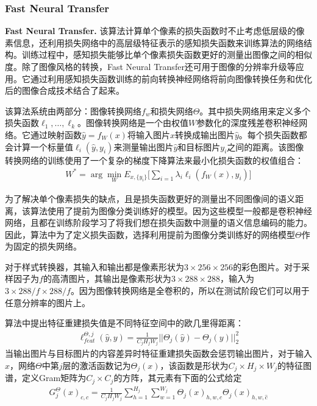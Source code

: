 
\subsubsection{Fast Neural Transfer}

\textbf{Fast Neural Transfer.}\cite{FNT} 该算法计算单个像素的损失函数时不止考虑低层级的像素信息，还利用损失网络中的高层级特征表示的感知损失函数来训练算法的网络结构。训练过程中，感知损失能够比单个像素损失函数更好的测量出图像之间的相似度。除了图像风格的转换，Fast Neural Transfer还可用于图像的分辨率升级等应用。它通过利用感知损失函数训练的前向转换神经网络将前向图像转换任务和优化后的图像合成技术结合了起来。

该算法系统由两部分：图像转换网络$f_w$和损失网络$\Theta$。其中损失网络用来定义多个损失函数$\ell_1,\dots,\ell_k$。图像转换网络是一个由权值$W$参数化的深度残差卷积神经网络。它通过映射函数$\hat{y}=f_W(x)$将输入图片$x$转换成输出图片$\hat{y}$。每个损失函数都会计算一个标量值$\ell_i(\hat{y},y_i)$来测量输出图片$\hat{y}$和目标图片$y_i$之间的距离。该图像转换网络的训练使用了一个复杂的梯度下降算法来最小化损失函数的权值组合：
\begin{align}
    W^*=\arg \min_W E_{x,\{y_i\}}\Big[\sum_{i=1}\lambda_i\ell_i(f_W(x),y_i)\Big]
\end{align}

为了解决单个像素损失的缺点，且是损失函数更好的测量出不同图像间的语义距离，该算法使用了提前为图像分类训练好的模型。因为这些模型一般都是卷积神经网络，且都在训练阶段学习了将我们想在损失函数中测量的语义信息编码的能力。因此，算法中为了定义损失函数，选择利用提前为图像分类训练好的网络模型$\Theta$作为固定的损失网络。

对于样式转换器，其输入和输出都是像素形状为$3\times 256 \times 256$的彩色图片。对于采样因子为$f$的高清图片，其输出是像素形状为$3\times288\times288$，输入为$3\times288/f\times288/f$。因为图像转换网络是全卷积的，所以在测试阶段它们可以用于任意分辨率的图片上。

算法中提出特征重建损失值是不同特征空间中的欧几里得距离：
\begin{align}
    \ell_{feat}^{\Theta,j}(\hat{y},y)=\frac{1}{C_jH_jW_j}||\Theta_j(\hat{y})-\Theta_j(y)||_2^2
\end{align}
当输出图片与目标图片的内容差异时特征重建损失函数会惩罚输出图片，对于输入$x$，网络$\Theta$中第$j$层的激活函数记为$\Theta_j(x)$，该函数是形状为$C_j\times H_j\times W_j$的特征图谱，定义Gram矩阵为$C_j\times C_j$的方阵，其元素有下面的公式给定
\begin{align}
    G_j^{\Theta}(x)_{c,\hat{c}}=\frac{1}{C_jH_jW_j}\sum_{h=1}^{H_j}\sum_{w=1}^{W_j}\Theta_j(x)_{h,w,c}\Theta_j(x)_{h,w,\hat{c}}
\end{align}

